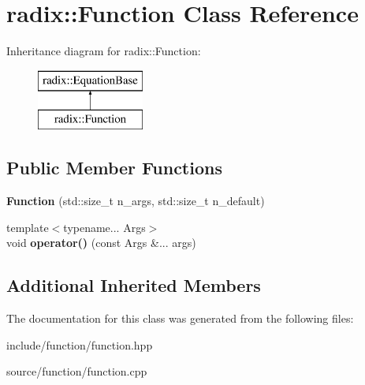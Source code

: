 \hypertarget{classradix_1_1Function}{}\section{radix\+:\+:Function Class Reference}
\label{classradix_1_1Function}
Inheritance diagram for radix\+:\+:Function\+:\begin{figure}[H]
\begin{center}
\leavevmode
\includegraphics[height=2.000000cm]{classradix_1_1Function}
\end{center}
\end{figure}
\subsection*{Public Member Functions}
\begin{DoxyCompactItemize}
\item 
\mbox{\label{classradix_1_1Function_a3d03267593beba87b9b1064065cdac60}} 
{\bfseries Function} (std\+::size\+\_\+t n\+\_\+args, std\+::size\+\_\+t n\+\_\+default)
\item 
\mbox{\label{classradix_1_1Function_a341d93b270c5c539a6dadc1bd7bbd3f0}} 
{\footnotesize template$<$typename... Args$>$ }\\void {\bfseries operator()} (const Args \&... args)
\end{DoxyCompactItemize}
\subsection*{Additional Inherited Members}


The documentation for this class was generated from the following files\+:\begin{DoxyCompactItemize}
\item 
include/function/function.\+hpp\item 
source/function/function.\+cpp\end{DoxyCompactItemize}
